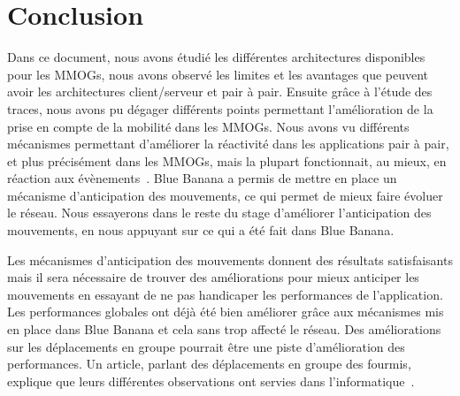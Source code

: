 \section{Conclusion}
	Dans ce document, nous avons étudié les différentes architectures disponibles pour les MMOGs, nous avons observé les limites et les avantages que peuvent avoir les architectures client/serveur et pair à pair. Ensuite grâce à l'étude des traces, nous avons pu dégager différents points permettant l'amélioration de la prise en compte de la mobilité dans les MMOGs. Nous avons vu différents mécanismes permettant d'améliorer la réactivité dans les applications pair à pair, et plus précisément dans les MMOGs, mais la plupart fonctionnait, au mieux, en réaction aux évènements~\cite{10.1109/SRDS.2006.33}. Blue Banana a permis de mettre en place un mécanisme d'anticipation des mouvements, ce qui permet de mieux faire évoluer le réseau. Nous essayerons dans le reste du stage d'améliorer l'anticipation des mouvements, en nous appuyant sur ce qui a été fait dans Blue Banana.\\

	\par Les mécanismes d'anticipation des mouvements donnent des résultats satisfaisants mais il sera nécessaire de trouver des améliorations pour mieux anticiper les mouvements en essayant de ne pas handicaper les performances de l'application. Les performances globales ont déjà été bien améliorer grâce aux mécanismes mis en place dans Blue Banana et cela sans trop affecté le réseau. Des améliorations sur les déplacements en groupe pourrait être une piste d'amélioration des performances. Un  article, parlant des déplacements en groupe des fourmis, explique que leurs différentes observations ont servies dans l'informatique~\cite{fourmis}. 
		
